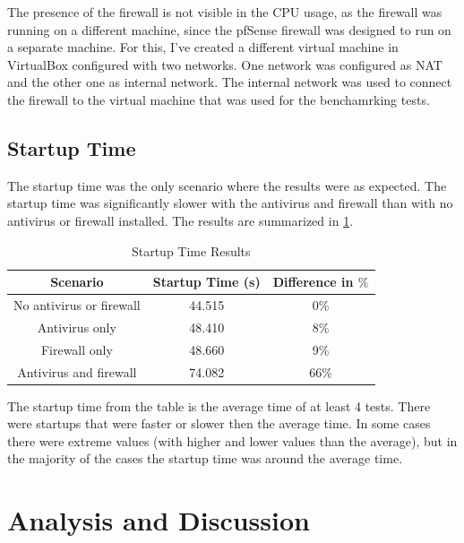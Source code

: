 \documentclass[runningheads,a4paper,english]{llncs}[2022/01/12]
\begin{document}
\par The presence of the firewall is not visible in the CPU usage, as the
firewall was running on a different machine, since the pfSense firewall
was designed to run on a separate machine. For this, I've created a different
virtual machine in VirtualBox configured with two networks. One network was
configured as NAT and the other one as internal network. The internal network
was used to connect the firewall to the virtual machine that was used for the
benchamrking tests.

\subsection{Startup Time}
\label{sec:startup}

\par The startup time was the only scenario where the results were as expected.
The startup time was significantly slower with the antivirus and firewall than
with no antivirus or firewall installed. The results are summarized in
\cref{tab:startup}.

\begin{table}[h]
\centering
  \begin{tabular}{|c|c|c|}
    \hline
    Scenario & Startup Time (s) & Difference in $\%$ \\
    \hline
    No antivirus or firewall & 44.515 & 0\% \\
    Antivirus only & 48.410 & 8\% \\
    Firewall only & 48.660 & 9\% \\
    Antivirus and firewall & 74.082 & 66\% \\
    \hline
  \end{tabular}
  \caption{Startup Time Results}
  \label{tab:startup}
\end{table}

\par The startup time from the table is the average time of at least 4 tests.
There were startups that were faster or slower then the average time. In some
cases there were extreme values (with higher and lower values than the average),
but in the majority of the cases the startup time was around the average time.


\section{Analysis and Discussion}
\label{sec:discussion}
\end{document}
